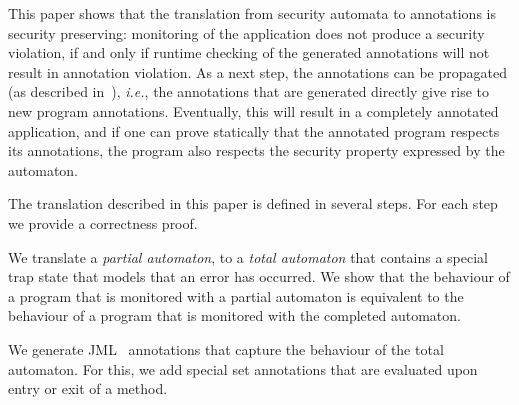 This paper shows that the translation from security automata to
annotations is security preserving: monitoring of the application does
not produce a security violation, if and only if runtime checking of
the generated annotations will not result in annotation violation.
As a next step, the annotations can be propagated (as described
in~\cite{PavlovaBBHL04}), \emph{i.e.}, the annotations that are
generated directly give rise to new program annotations. Eventually,
this will result in a completely annotated application, and if one can
prove statically that the annotated program respects its annotations,
the program also respects the security property expressed by the automaton.

The translation described in this paper is defined in several
steps. For each step we provide a correctness proof.
\begin{inparaenum}
\item We translate a \emph{partial automaton}, to a \emph{total automaton}
that contains a special trap state that models that an error has occurred.
%
We show that the behaviour of a program that is monitored with a partial
automaton is equivalent to the behaviour of a program that is monitored with
the completed automaton.
\item We generate JML~\cite{LeavensPCCRCK05} annotations that capture the
behaviour of the total automaton.
For this, we add special \textsf{set} annotations that are evaluated
upon entry or exit of a method.

\end{inparaenum}
